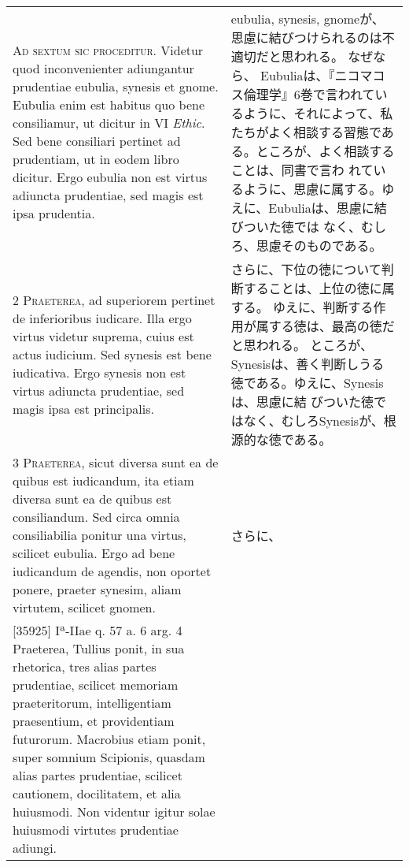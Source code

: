 \documentclass[10pt]{jsarticle} %
\begin{document}
\begin{longtable}{p{21em}p{21em}}

{\huge A}{\scshape d sextum sic proceditur}. Videtur quod inconvenienter
adiungantur prudentiae eubulia, synesis et gnome. Eubulia enim est
habitus quo bene consiliamur, ut dicitur in VI {\itshape Ethic}. Sed
bene consiliari pertinet ad prudentiam, ut in eodem libro dicitur. Ergo
eubulia non est virtus adiuncta prudentiae, sed magis est ipsa
prudentia.


&
eubulia, synesis, gnomeが、思慮に結びつけられるのは不適切だと思われる。
 なぜなら、
Eubuliaは、『ニコマコス倫理学』6巻で言われているように、それによって、私
 たちがよく相談する習態である。ところが、よく相談することは、同書で言わ
 れているように、思慮に属する。ゆえに、Eubuliaは、思慮に結びついた徳では
 なく、むしろ、思慮そのものである。

\\

{\scshape 2 Praeterea}, ad superiorem pertinet de
inferioribus iudicare. Illa ergo virtus videtur suprema, cuius est actus
iudicium. Sed synesis est bene iudicativa. Ergo synesis non est virtus
adiuncta prudentiae, sed magis ipsa est principalis.

&
さらに、下位の徳について判断することは、上位の徳に属する。
ゆえに、判断する作用が属する徳は、最高の徳だと思われる。
ところが、Synesisは、善く判断しうる徳である。ゆえに、Synesisは、思慮に結
 びついた徳ではなく、むしろSynesisが、根源的な徳である。

\\


{\scshape 3 Praeterea}, sicut diversa sunt ea de
quibus est iudicandum, ita etiam diversa sunt ea de quibus est
consiliandum. Sed circa omnia consiliabilia ponitur una virtus, scilicet
eubulia. Ergo ad bene iudicandum de agendis, non oportet ponere, praeter
synesim, aliam virtutem, scilicet gnomen.


&
さらに、

\\


[35925] Iª-IIae q. 57 a. 6 arg. 4 Praeterea, Tullius ponit, in sua
rhetorica, tres alias partes prudentiae, scilicet memoriam
praeteritorum, intelligentiam praesentium, et providentiam
futurorum. Macrobius etiam ponit, super somnium Scipionis, quasdam alias
partes prudentiae, scilicet cautionem, docilitatem, et alia
huiusmodi. Non videntur igitur solae huiusmodi virtutes prudentiae
adiungi.


&


\\



\end{longtable}
\end{document}
